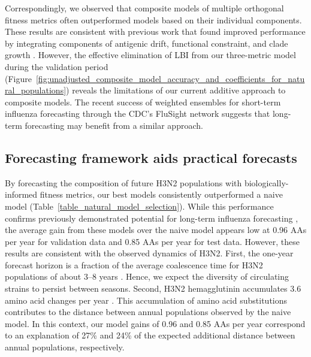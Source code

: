 Correspondingly, we observed that composite models of multiple orthogonal fitness metrics often outperformed models based on their individual components.
These results are consistent with previous work that found improved performance by integrating components of antigenic drift, functional constraint, and clade growth \citep{Luksza:2014hj}.
However, the effective elimination of LBI from our three-metric model during the validation period (Figure~\ref{fig:unadjusted_composite_model_accuracy_and_coefficients_for_natural_populations}) reveals the limitations of our current additive approach to composite models.
The recent success of weighted ensembles for short-term influenza forecasting through the CDC's FluSight network \citep{Reich:2019bq} suggests that long-term forecasting may benefit from a similar approach.

\subsection*{Forecasting framework aids practical forecasts}

By forecasting the composition of future H3N2 populations with biologically-informed fitness metrics, our best models consistently outperformed a naive model (Table~\ref{table_natural_model_selection}).
While this performance confirms previously demonstrated potential for long-term influenza forecasting \citep{Luksza:2014hj}, the average gain from these models over the naive model appears low at 0.96 AAs per year for validation data and 0.85 AAs per year for test data.
However, these results are consistent with the observed dynamics of H3N2.
First, the one-year forecast horizon is a fraction of the average coalescence time for H3N2 populations of about 3--8 years \citep{Rambaut:2008ew}.
Hence, we expect the diversity of circulating strains to persist between seasons.
Second, H3N2 hemagglutinin accumulates 3.6 amino acid changes per year \citep{Smith:2004jc}.
This accumulation of amino acid substitutions contributes to the distance between annual populations observed by the naive model.
In this context, our model gains of 0.96 and 0.85 AAs per year correspond to an explanation of 27\% and 24\% of the expected additional distance between annual populations, respectively.

